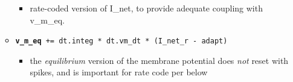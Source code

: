 \begin{itemize}
\begin{itemize}
    \begin{itemize}
    \tightlist
    \item
      rate-coded version of I\_net, to provide adequate coupling with
      v\_m\_eq.
    \end{itemize}
  \item
    \textbf{\texttt{v\_m\_eq}}\texttt{\ +=\ dt.integ\ *\ dt.vm\_dt\ *\ (I\_net\_r\ -\ adapt)}

    \begin{itemize}
    \tightlist
    \item
      the \emph{equilibrium} version of the membrane potential does
      \emph{not} reset with spikes, and is important for rate code per
      below
    \end{itemize}
  \end{itemize}
\end{itemize}

